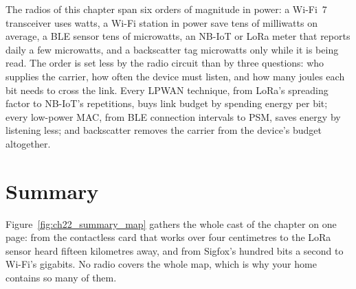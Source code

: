 
\begin{keyidea}
The radios of this chapter span six orders of magnitude in power: a Wi-Fi~7 transceiver uses watts, a
Wi-Fi station in power save tens of milliwatts on average, a BLE sensor tens of microwatts, an NB-IoT
or LoRa meter that reports daily a few microwatts, and a backscatter tag microwatts only while it is
being read. The order is set less by the radio circuit than by three questions: who supplies the
carrier, how often the device must listen, and how many joules each bit needs to cross the link.
Every LPWAN technique, from LoRa's spreading factor to NB-IoT's repetitions, buys link budget by
spending energy per bit; every low-power MAC, from BLE connection intervals to PSM, saves energy by
listening less; and backscatter removes the carrier from the device's budget altogether.
\end{keyidea}

\section{Summary}

Figure~\ref{fig:ch22_summary_map} gathers the whole cast of the chapter on one page: from the
contactless card that works over four centimetres to the LoRa sensor heard fifteen kilometres away,
and from Sigfox's hundred bits a second to Wi-Fi's gigabits. No radio covers the whole map, which is
why your home contains so many of them.


